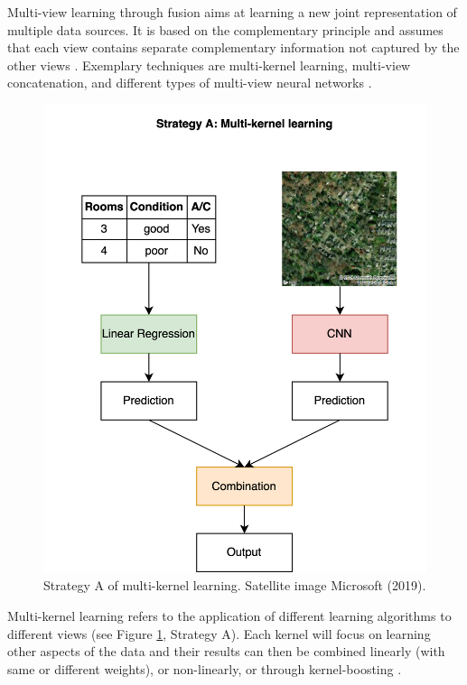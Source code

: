 \documentclass[letterpaper]{article} %
\begin{document}
Multi-view learning through fusion aims at learning a new joint representation of multiple data sources. It is based on the complementary principle and assumes that each view contains separate complementary information not captured by the other views \cite{xu2013survey}. Exemplary techniques are multi-kernel learning, multi-view concatenation, and different types of multi-view neural networks \cite{li2018survey, xu2013survey}.

\begin{figure}[!b]
\centering
\includegraphics[width=0.9\columnwidth]{StrategyA.png} %
\caption{Strategy A of multi-kernel learning. Satellite image \textcopyright \space Microsoft (2019).}
\label{strategyA}
\end{figure}

Multi-kernel learning refers to the application of different learning algorithms to different views (see Figure \ref{strategyA}, Strategy A). Each kernel will focus on learning other aspects of the data and their results can then be combined linearly (with same or different weights), or non-linearly, or through kernel-boosting \cite{xu2013survey}.
\end{document}
